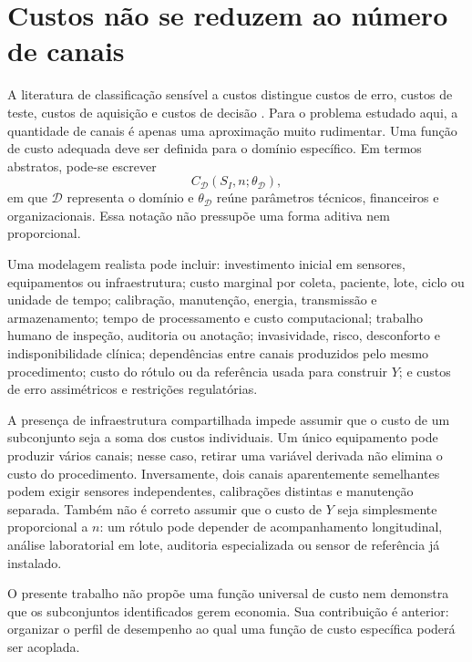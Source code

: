 \section{Custos não se reduzem ao número de canais}

A literatura de classificação sensível a custos distingue custos de erro, custos de teste, custos de aquisição e custos de decisão \cite{turney1995,turney2002}. Para o problema estudado aqui, a quantidade de canais é apenas uma aproximação muito rudimentar. Uma função de custo adequada deve ser definida para o domínio específico. Em termos abstratos, pode-se escrever
\[
C_{\mathcal{D}}(S_I,n;\theta_{\mathcal{D}}),
\]
em que $\mathcal{D}$ representa o domínio e $\theta_{\mathcal{D}}$ reúne parâmetros técnicos, financeiros e organizacionais. Essa notação não pressupõe uma forma aditiva nem proporcional.

Uma modelagem realista pode incluir: investimento inicial em sensores, equipamentos ou infraestrutura; custo marginal por coleta, paciente, lote, ciclo ou unidade de tempo; calibração, manutenção, energia, transmissão e armazenamento; tempo de processamento e custo computacional; trabalho humano de inspeção, auditoria ou anotação; invasividade, risco, desconforto e indisponibilidade clínica; dependências entre canais produzidos pelo mesmo procedimento; custo do rótulo ou da referência usada para construir $Y$; e custos de erro assimétricos e restrições regulatórias.

A presença de infraestrutura compartilhada impede assumir que o custo de um subconjunto seja a soma dos custos individuais. Um único equipamento pode produzir vários canais; nesse caso, retirar uma variável derivada não elimina o custo do procedimento. Inversamente, dois canais aparentemente semelhantes podem exigir sensores independentes, calibrações distintas e manutenção separada. Também não é correto assumir que o custo de $Y$ seja simplesmente proporcional a $n$: um rótulo pode depender de acompanhamento longitudinal, análise laboratorial em lote, auditoria especializada ou sensor de referência já instalado.

\begin{interpretationbox}
O presente trabalho não propõe uma função universal de custo nem demonstra que os subconjuntos identificados gerem economia. Sua contribuição é anterior: organizar o perfil de desempenho ao qual uma função de custo específica poderá ser acoplada.
\end{interpretationbox}

